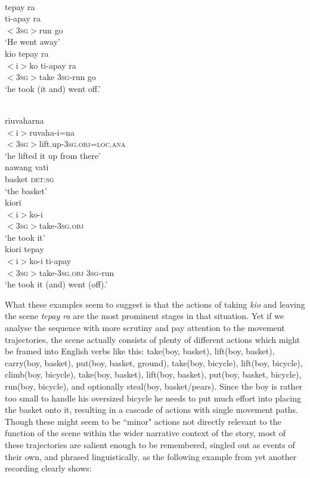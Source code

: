 \ea 
{}\\
\ea
\glll tepay ra \\
ti-apay ra \\
$<$\textsc{3}\textsc{sg}$>$run go \\
\glft `He went away' \\
\ex
\glll kio tepay ra\\
$<$i$>$ko ti-apay ra \\
$<$\textsc{3}\textsc{sg}$>$take \textsc{3}\textsc{sg}-run go\\
\glft `he took (it and) went off.'\\ 
\z
\z

\ea 
{}\\
\ea
\glll riuvaharna \\
$<$i$>$ruvaha-i=na \\
$<$\textsc{3}\textsc{sg}$>$lift.up-\textsc{3}\textsc{sg}.\textsc{obj}=\textsc{loc}.\textsc{ana}\\
\glft `he lifted it up from there'\\
\ex
\gll nawang vati\\
basket \textsc{det}:\textsc{sg} \\
\glft `the basket'\\
\ex
\glll kiori\\
$<$i$>$ko-i \\
$<$\textsc{3}\textsc{sg}$>$take-\textsc{3}\textsc{sg}.\textsc{obj}\\
\glft `he took it'\\
\ex
\glll kiori tepay\\
$<$i$>$ko-i ti-apay \\
$<$\textsc{3}\textsc{sg}$>$take-\textsc{3}\textsc{sg}.\textsc{obj} \textsc{3}\textsc{sg}-run\\
\glft `he took it (and) went (off).' \\
\z
\z

What these examples seem to suggest is that the actions of taking \textit{kio} and leaving the scene \textit{tepay ra} are the most prominent stages in that situation. Yet if we analyse the sequence with more scrutiny and pay attention to the movement trajectories, the scene actually consists of plenty of different actions which might be framed into English verbs like this: take(boy, basket), lift(boy, basket), carry(boy, basket), put(boy, basket, ground), take(boy, bicycle), lift(boy, bicycle), climb(boy, bicycle), take(boy, basket), lift(boy, basket), put(boy, basket, bicycle), run(boy, bicycle), and optionally steal(boy, basket/pears). Since the boy is rather too small to handle his oversized bicycle he needs to put much effort into placing the basket onto it, resulting in a cascade of actions with single movement paths. Though these might seem to be ``minor" actions not directly relevant to the function of the scene within the wider narrative context of the story, most of these trajectories are salient enough to be remembered, singled out as events of their own, and phrased linguistically, as the following example from yet another recording clearly shows:


